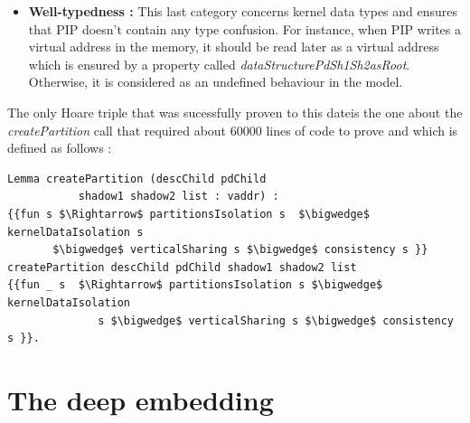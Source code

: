\begin{itemize}
\begin{lstlisting}[caption = {Example of a pages-consistency property}, mathescape=true,xleftmargin=.07\textwidth,
xrightmargin=.07\textwidth]
Definition noDupMappedPagesList s :=
$\forall$ partition, partition $\in$ getPartitions s $\rightarrow$
NoDup (getMappedPages partition s).
\end{lstlisting}	
	\item \textbf{Well-typedness :} This last category concerns kernel data types and ensures that PIP doesn't contain any type confusion. For instance, when PIP writes a virtual address in the memory, it should be read later as a virtual address which is ensured by a property called \textit{dataStructurePdSh1Sh2asRoot}. Otherwise, it is considered as an undefined behaviour in the model.
\end{itemize}
The only Hoare triple that was sucessfully proven to this date\footnotemark[1] is the one about the \textit{createPartition} call that required about 60000 lines of code to prove and which is defined as follows :
\begin{lstlisting}[caption = {createPartition Hoare triple}, mathescape=true]
Lemma createPartition (descChild pdChild
           shadow1 shadow2 list : vaddr) :
{{fun s $\Rightarrow$ partitionsIsolation s  $\bigwedge$ kernelDataIsolation s 
	   $\bigwedge$ verticalSharing s $\bigwedge$ consistency s }} 
createPartition descChild pdChild shadow1 shadow2 list  
{{fun _ s  $\Rightarrow$ partitionsIsolation s $\bigwedge$ kernelDataIsolation 
              s $\bigwedge$ verticalSharing s $\bigwedge$ consistency s }}.
\end{lstlisting}	
\footnotetext[1]{\today}
\pagebreak

\section{The deep embedding} \label{deep}

